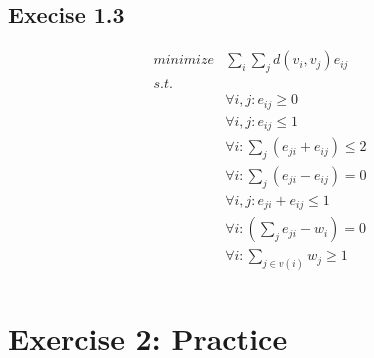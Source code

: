 \documentclass[11pt,a4paper]{article}
\begin{document}
\subsection{Execise 1.3}
\begin{align*}
    minimize & \sum_i \sum_j d(v_i, v_j) e_{ij} \\
    s.t.     & \\
             & \forall i, j: e_{ij} \geq 0 \\
             & \forall i, j: e_{ij} \leq 1 \\
             & \forall i: \sum_j (e_{ji} + e_{ij}) \leq 2 \\
             & \forall i: \sum_j (e_{ji} - e_{ij}) = 0 \\
             & \forall i,j: e_{ji} + e_{ij} \leq 1 \\
             & \forall i: (\sum_j e_{ji} - w_i) = 0 \\
             & \forall i: \sum_{j \in v(i)} w_j \geq 1 \\
\end{align*}

\section{Exercise 2: Practice}
\end{document}
